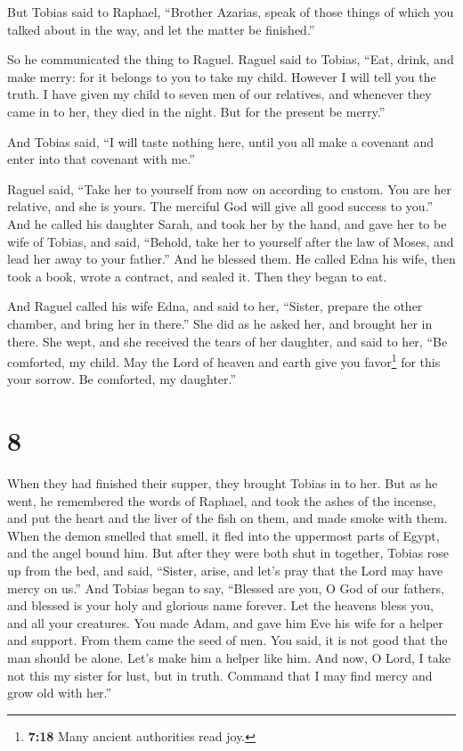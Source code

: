 But Tobias said to Raphael, ``Brother Azarias, speak of those things of
which you talked about in the way, and let the matter be finished.''

 So he communicated the thing to Raguel. Raguel said to
Tobias, ``Eat, drink, and make merry:  for it belongs to
you to take my child. However I will tell you the truth. 
I have given my child to seven men of our relatives, and whenever they
came in to her, they died in the night. But for the present be merry.''

And Tobias said, ``I will taste nothing here, until you all make a
covenant and enter into that covenant with me.''

 Raguel said, ``Take her to yourself from now on
according to custom. You are her relative, and she is yours. The
merciful God will give all good success to you.''  And he
called his daughter Sarah, and took her by the hand, and gave her to be
wife of Tobias, and said, ``Behold, take her to yourself after the law
of Moses, and lead her away to your father.'' And he blessed them.
 He called Edna his wife, then took a book, wrote a
contract, and sealed it.  Then they began to eat.

 And Raguel called his wife Edna, and said to her,
``Sister, prepare the other chamber, and bring her in there.''
 She did as he asked her, and brought her in there. She
wept, and she received the tears of her daughter, and said to her,
 ``Be comforted, my child. May the Lord of heaven and
earth give you favor\footnote{\textbf{7:18} Many ancient authorities
  read joy.} for this your sorrow. Be comforted, my daughter.''

\hypertarget{section-7}{%
\section{8}\label{section-7}}

 When they had finished their supper, they brought Tobias
in to her.  But as he went, he remembered the words of
Raphael, and took the ashes of the incense, and put the heart and the
liver of the fish on them, and made smoke with them.  When
the demon smelled that smell, it fled into the uppermost parts of Egypt,
and the angel bound him.  But after they were both shut in
together, Tobias rose up from the bed, and said, ``Sister, arise, and
let's pray that the Lord may have mercy on us.''  And
Tobias began to say, ``Blessed are you, O God of our fathers, and
blessed is your holy and glorious name forever. Let the heavens bless
you, and all your creatures.  You made Adam, and gave him
Eve his wife for a helper and support. From them came the seed of men.
You said, it is not good that the man should be alone. Let's make him a
helper like him.  And now, O Lord, I take not this my
sister for lust, but in truth. Command that I may find mercy and grow
old with her.''


